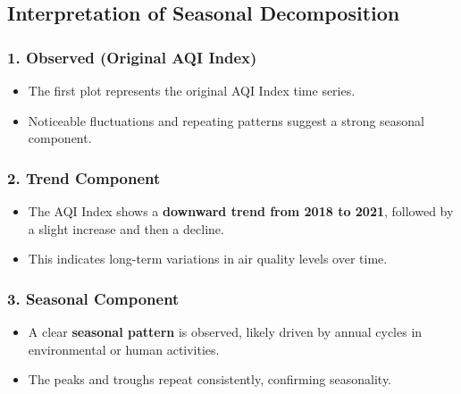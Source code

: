 \documentclass[11pt]{article}
\providecommand{\tightlist}{%
      \setlength{\itemsep}{0pt}\setlength{\parskip}{0pt}}
\begin{document}
    \hypertarget{interpretation-of-seasonal-decomposition}{%
\subsection{Interpretation of Seasonal
Decomposition}\label{interpretation-of-seasonal-decomposition}}

\hypertarget{observed-original-aqi-index}{%
\subsubsection{\texorpdfstring{1. \textbf{Observed (Original AQI
Index)}}{1. Observed (Original AQI Index)}}\label{observed-original-aqi-index}}

\begin{itemize}
\tightlist
\item
  The first plot represents the original AQI Index time series.
\item
  Noticeable fluctuations and repeating patterns suggest a strong
  seasonal component.
\end{itemize}

\hypertarget{trend-component}{%
\subsubsection{\texorpdfstring{2. \textbf{Trend
Component}}{2. Trend Component}}\label{trend-component}}

\begin{itemize}
\tightlist
\item
  The AQI Index shows a \textbf{downward trend from 2018 to 2021},
  followed by a slight increase and then a decline.
\item
  This indicates long-term variations in air quality levels over time.
\end{itemize}

\hypertarget{seasonal-component}{%
\subsubsection{\texorpdfstring{3. \textbf{Seasonal
Component}}{3. Seasonal Component}}\label{seasonal-component}}

\begin{itemize}
\tightlist
\item
  A clear \textbf{seasonal pattern} is observed, likely driven by annual
  cycles in environmental or human activities.
\item
  The peaks and troughs repeat consistently, confirming seasonality.
\end{itemize}
\end{document}
